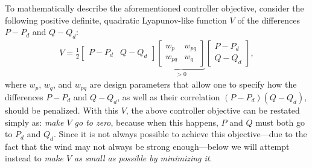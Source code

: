 \documentclass[journal]{IEEEtran}
\begin{document}
To mathematically describe the aforementioned controller objective, consider the following positive definite, quadratic Lyapunov-like function $V$ of the differences $P-P_d$ and $Q-Q_d$:
\begin{align}
V=\frac{1}{2}\begin{bmatrix} P-P_d & Q-Q_d \end{bmatrix}
\underbrace{\begin{bmatrix}
w_p & w_{pq} \\
w_{pq} & w_q
\end{bmatrix}}_{>0}
\begin{bmatrix}
P-P_d \\
Q-Q_d
\end{bmatrix},\label{eqn:objfun}
\end{align}
where $w_p$, $w_q$, and $w_{pq}$ are design parameters that allow one to specify how the differences $P-P_d$ and $Q-Q_d$, as well as their correlation $(P-P_d)(Q-Q_d)$, should be penalized. With this $V$, the above controller objective can be restated simply as: {\em make $V$ go to zero}, because when this happens, $P$ and $Q$ must both go to $P_d$ and $Q_d$. Since it is not always possible to achieve this objective---due to the fact that the wind may not always be strong enough---below we will attempt instead to {\em make $V$ as small as possible by minimizing it}.
\end{document}
